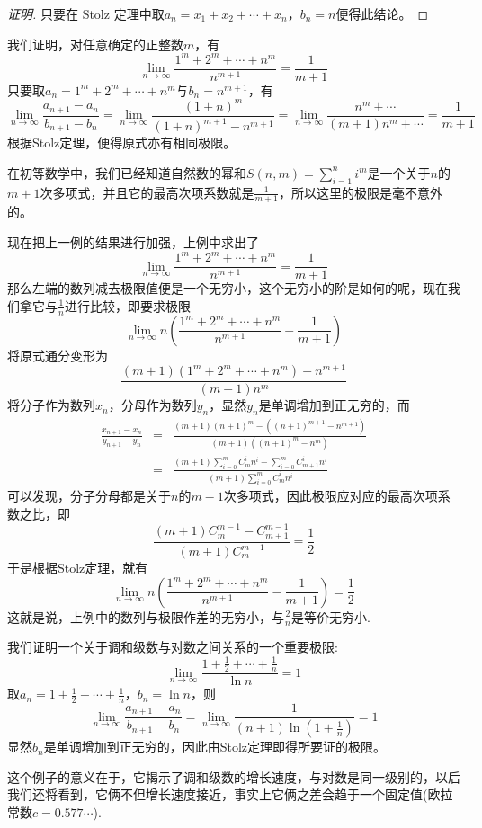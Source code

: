 \begin{proof}[证明]
  只要在 Stolz 定理中取$a_n=x_1+x_2+\cdots+x_n$，$b_n=n$便得此结论。
\end{proof}

\begin{example}
  我们证明，对任意确定的正整数$m$，有
  \[ \lim_{n \to \infty} \frac{1^m+2^m+\cdots+n^m}{n^{m+1}} = \frac{1}{m+1} \]
  只要取$a_n=1^m+2^m+\cdots+n^m$与$b_n=n^{m+1}$，有
  \[ \lim_{n \to \infty} \frac{a_{n+1}-a_n}{b_{n+1}-b_n} = \lim_{n \to \infty} \frac{(1+n)^m}{(1+n)^{m+1}-n^{m+1}} = \lim_{n \to \infty} \frac{n^m+\cdots}{(m+1)n^m+\cdots} = \frac{1}{m+1} \]
  根据Stolz定理，便得原式亦有相同极限。

  在初等数学中，我们已经知道自然数的幂和$S(n,m)=\sum\limits_{i=1}^ni^m$是一个关于$n$的$m+1$次多项式，并且它的最高次项系数就是$\frac{1}{m+1}$，所以这里的极限是毫不意外的。
\end{example}

\begin{example}
  现在把上一例的结果进行加强，上例中求出了
  \[ \lim_{n \to \infty} \frac{1^m+2^m+\cdots+n^m}{n^{m+1}} = \frac{1}{m+1} \]
  那么左端的数列减去极限值便是一个无穷小，这个无穷小的阶是如何的呢，现在我们拿它与$\frac{1}{n}$进行比较，即要求极限
  \[ \lim_{n \to \infty} n \left( \frac{1^m+2^m+\cdots+n^m}{n^{m+1}} - \frac{1}{m+1} \right) \]
  将原式通分变形为
  \[ \frac{(m+1)(1^m+2^m+\cdots+n^m)-n^{m+1}}{(m+1)n^m} \]
  将分子作为数列$x_n$，分母作为数列$y_n$，显然$y_n$是单调增加到正无穷的，而
  \begin{eqnarray*}
    \frac{x_{n+1}-x_n}{y_{n+1}-y_n} & = & \frac{(m+1)(n+1)^m-((n+1)^{m+1}-n^{m+1})}{(m+1)((n+1)^m-n^m)} \\
    & = & \frac{(m+1)\sum_{i=0}^mC_m^in^i-\sum_{i=0}^mC_{m+1}^in^i}{(m+1)\sum_{i=0}^mC_m^in^i}
  \end{eqnarray*}
  可以发现，分子分母都是关于$n$的$m-1$次多项式，因此极限应对应的最高次项系数之比，即
  \[ \frac{(m+1)C_m^{m-1}-C_{m+1}^{m-1}}{(m+1)C_m^{m-1}} = \frac{1}{2} \]
  于是根据Stolz定理，就有
  \[ \lim_{n \to \infty} n \left( \frac{1^m+2^m+\cdots+n^m}{n^{m+1}} - \frac{1}{m+1} \right) = \frac{1}{2} \]
  这就是说，上例中的数列与极限作差的无穷小，与$\frac{2}{n}$是等价无穷小.
\end{example}

\begin{example}
  我们证明一个关于调和级数与对数之间关系的一个重要极限:
  \[ \lim_{n \to \infty} \frac{1+\frac{1}{2}+\cdots+\frac{1}{n}}{\ln{n}} = 1 \]
  取$a_n=1+\frac{1}{2}+\cdots+\frac{1}{n}$，$b_n=\ln{n}$，则
  \[ \lim_{n \to \infty} \frac{a_{n+1}-a_n}{b_{n+1}-b_n} = \lim_{n \to \infty} \frac{1}{(n+1)\ln{\left( 1+ \frac{1}{n} \right)}} = 1 \]
  显然$b_n$是单调增加到正无穷的，因此由Stolz定理即得所要证的极限。

  这个例子的意义在于，它揭示了调和级数的增长速度，与对数是同一级别的，以后我们还将看到，它俩不但增长速度接近，事实上它俩之差会趋于一个固定值(欧拉常数$c=0.577\cdots$).
\end{example}


